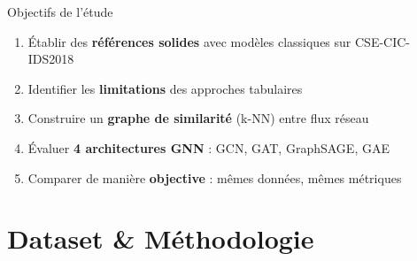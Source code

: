 ﻿\documentclass[aspectratio=169]{beamer}
\begin{document}
\begin{frame}{Objectifs de l'étude}
\begin{enumerate}
    \item Établir des \textbf{références solides} avec modèles classiques sur CSE-CIC-IDS2018
    
    \item Identifier les \textbf{limitations} des approches tabulaires
    
    \item Construire un \textbf{graphe de similarité} (k-NN) entre flux réseau
    
    \item Évaluer \textbf{4 architectures GNN} : GCN, GAT, GraphSAGE, GAE
    
    \item Comparer de manière \textbf{objective} : mêmes données, mêmes métriques
\end{enumerate}
\end{frame}

\section{Dataset \& Méthodologie}
\end{document}
